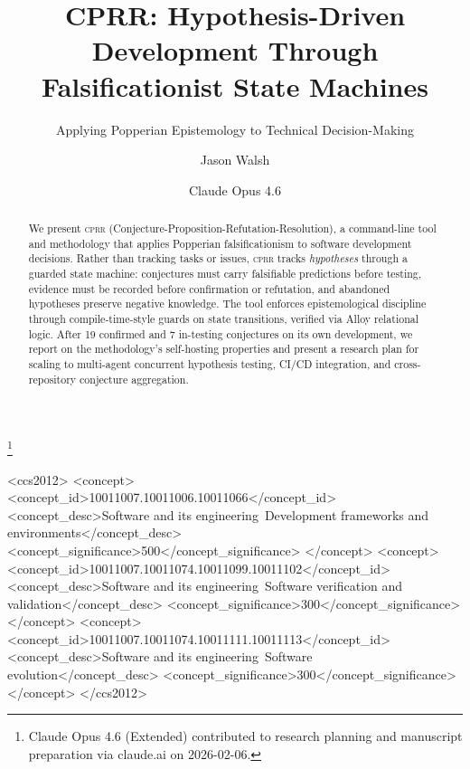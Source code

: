 \documentclass[sigconf,screen]{acmart}
\begin{document}
\title{CPRR: Hypothesis-Driven Development Through\\Falsificationist State Machines}
\subtitle{Applying Popperian Epistemology to Technical Decision-Making}

\author{Jason Walsh}

\author{Claude Opus 4.6}
\thanks{Claude Opus 4.6 (Extended) contributed to research planning and manuscript preparation via claude.ai on 2026-02-06.}

\begin{CCSXML}
<ccs2012>
<concept>
<concept_id>10011007.10011006.10011066</concept_id>
<concept_desc>Software and its engineering~Development frameworks and environments</concept_desc>
<concept_significance>500</concept_significance>
</concept>
<concept>
<concept_id>10011007.10011074.10011099.10011102</concept_id>
<concept_desc>Software and its engineering~Software verification and validation</concept_desc>
<concept_significance>300</concept_significance>
</concept>
<concept>
<concept_id>10011007.10011074.10011111.10011113</concept_id>
<concept_desc>Software and its engineering~Software evolution</concept_desc>
<concept_significance>300</concept_significance>
</concept>
</ccs2012>
\end{CCSXML}



\begin{abstract}
We present \textsc{cprr} (Conjecture-Proposition-Refutation-Resolution), a command-line tool and methodology that applies Popperian falsificationism to software development decisions. Rather than tracking tasks or issues, \textsc{cprr} tracks \emph{hypotheses} through a guarded state machine: conjectures must carry falsifiable predictions before testing, evidence must be recorded before confirmation or refutation, and abandoned hypotheses preserve negative knowledge. The tool enforces epistemological discipline through compile-time-style guards on state transitions, verified via Alloy relational logic. After 19 confirmed and 7 in-testing conjectures on its own development, we report on the methodology's self-hosting properties and present a research plan for scaling to multi-agent concurrent hypothesis testing, CI/CD integration, and cross-repository conjecture aggregation.
\end{abstract}
\end{document}
